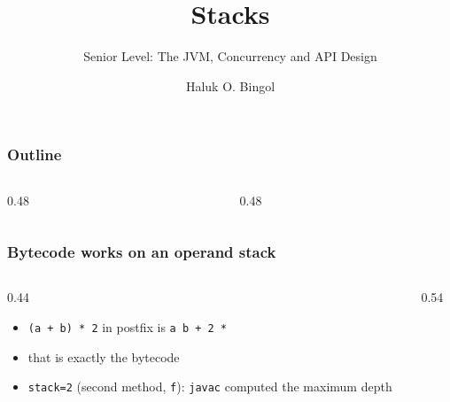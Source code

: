 \documentclass[aspectratio=169,10pt,compress]{beamer}
\title{Stacks}
\subtitle{Senior Level: The JVM, Concurrency and API Design}
\author[Bingol]{Haluk O. Bingol}
\institute[FCIS]{
    Faculty of Computer and Information Sciences\\
    Yeditepe University
}
\date{
	{\tiny \hbTimeStamp}
}
\begin{document}
\begin{frame}[t,fragile]
  \titlepage
\end{frame}




\begin{frame}[t,fragile] \frametitle{Outline}
  \begin{columns}[T]
    \begin{column}{0.48\textwidth}
      \tableofcontents[sections={1-3}, hideallsubsections]
    \end{column}
    \begin{column}{0.48\textwidth}
      \tableofcontents[sections={4-6}, hideallsubsections]
    \end{column}
  \end{columns}
\end{frame}





\begin{frame}[t,fragile] \frametitle{Bytecode works on an operand stack}
  \begin{columns}[T]
    \begin{column}{0.44\textwidth}
      \begin{itemize}\small
        \item \texttt{(a + b) * 2} in postfix is \texttt{a b + 2 *}
        \item that is exactly the bytecode
        \item \texttt{stack=2} (second method, \texttt{f}): \texttt{javac} computed the maximum depth
      \end{itemize}
    \end{column}
    \begin{column}{0.54\textwidth}
    \end{column}
  \end{columns}
\end{frame}
\end{document}
